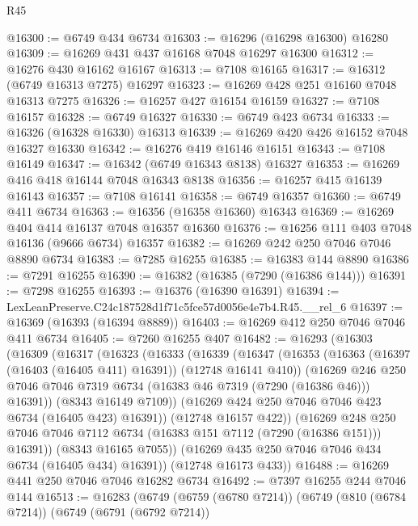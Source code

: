 \begin{lexlean}{R45}
\begin{coremodule}
{@16300 := @6749 @434 @6734
@16303 := @16296 (@16298 @16300) @16280
@16309 := @16269 @431 @437 @16168 @7048 @16297 @16300
@16312 := @16276 @430 @16162 @16167
@16313 := @7108 @16165
@16317 := @16312 (@6749 @16313 @7275) @16297
@16323 := @16269 @428 @251 @16160 @7048 @16313 @7275
@16326 := @16257 @427 @16154 @16159
@16327 := @7108 @16157
@16328 := @6749 @16327
@16330 := @6749 @423 @6734
@16333 := @16326 (@16328 @16330) @16313
@16339 := @16269 @420 @426 @16152 @7048 @16327 @16330
@16342 := @16276 @419 @16146 @16151
@16343 := @7108 @16149
@16347 := @16342 (@6749 @16343 @8138) @16327
@16353 := @16269 @416 @418 @16144 @7048 @16343 @8138
@16356 := @16257 @415 @16139 @16143
@16357 := @7108 @16141
@16358 := @6749 @16357
@16360 := @6749 @411 @6734
@16363 := @16356 (@16358 @16360) @16343
@16369 := @16269 @404 @414 @16137 @7048 @16357 @16360
@16376 := @16256 @111 @403 @7048 @16136 (@9666 @6734) @16357
@16382 := @16269 @242 @250 @7046 @7046 @8890 @6734
@16383 := @7285 @16255
@16385 := @16383 @144 @8890
@16386 := @7291 @16255
@16390 := @16382 (@16385 (@7290 (@16386 @144)))
@16391 := @7298 @16255
@16393 := @16376 (@16390 @16391)
@16394 := LexLeanPreserve.C24c187528d1f71c5fce57d0056e4e7b4.R45.__rel_6
@16397 := @16369 (@16393 (@16394 @8889))
@16403 := @16269 @412 @250 @7046 @7046 @411 @6734
@16405 := @7260 @16255 @407
@16482 := @16293
    (@16303
      (@16309
        (@16317
          (@16323
            (@16333
              (@16339
                (@16347
                  (@16353
                    (@16363 (@16397 (@16403 (@16405 @411) @16391)) (@12748 @16141 @410))
                    (@16269
                      @246
                      @250
                      @7046
                      @7046
                      @7319
                      @6734
                      (@16383 @46 @7319 (@7290 (@16386 @46)))
                      @16391))
                  (@8343 @16149 @7109))
                (@16269 @424 @250 @7046 @7046 @423 @6734 (@16405 @423) @16391))
              (@12748 @16157 @422))
            (@16269
              @248
              @250
              @7046
              @7046
              @7112
              @6734
              (@16383 @151 @7112 (@7290 (@16386 @151)))
              @16391))
          (@8343 @16165 @7055))
        (@16269 @435 @250 @7046 @7046 @434 @6734 (@16405 @434) @16391))
      (@12748 @16173 @433))
@16488 := @16269 @441 @250 @7046 @7046 @16282 @6734
@16492 := @7397 @16255 @244 @7046 @144
@16513 := @16283
    (@6749
      (@6759 (@6780 @7214))
      (@6749
        (@810 (@6784 @7214))
        (@6749
          (@6791 (@6792 @7214))
}
\end{coremodule}
\end{lexlean}

